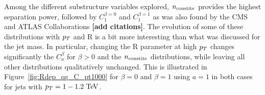 Among the different substructure variables explored, $n_{\rm constits}$ provides the highest separation
power, followed by $C_1^{\beta=0}$ and $C_1^{\beta=1}$ as was also found by the CMS and ATLAS Collaborations 
{\bf [add citations]}. The evolution of some of these distributions with $p_T$ and R is a bit more interesting than what
was discussed for the jet mass. In particular, changing the R parameter at high $p_T$ changes significantly the $C_a^{\beta}$
for $\beta>0$ and the $n_{\rm constits}$ distributions, while leaving all other distributions qualitatively unchanged. 
This is illustrated in Figure~\ref{fig:Rdep_qg_C_pt1000} for $\beta=0$ and $\beta=1$ using $a=1$ in both cases for
jets with $\pt=1-1.2\TeV$. 
\begin{figure}
\begin{center}
\\

\end{center}
\end{figure}
